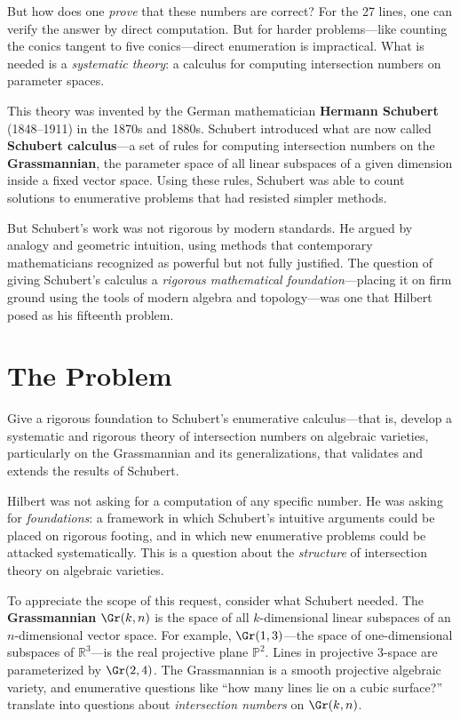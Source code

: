 But how does one \emph{prove} that these numbers are correct? For the 27 lines, one can verify the answer by direct computation. But for harder problems---like counting the conics tangent to five conics---direct enumeration is impractical. What is needed is a \emph{systematic theory}: a calculus for computing intersection numbers on parameter spaces.

This theory was invented by the German mathematician \textbf{Hermann Schubert} (1848--1911) in the 1870s and 1880s. Schubert introduced what are now called \textbf{Schubert calculus}---a set of rules for computing intersection numbers on the \textbf{Grassmannian}, the parameter space of all linear subspaces of a given dimension inside a fixed vector space. Using these rules, Schubert was able to count solutions to enumerative problems that had resisted simpler methods.

But Schubert's work was not rigorous by modern standards. He argued by analogy and geometric intuition, using methods that contemporary mathematicians recognized as powerful but not fully justified. The question of giving Schubert's calculus a \emph{rigorous mathematical foundation}---placing it on firm ground using the tools of modern algebra and topology---was one that Hilbert posed as his fifteenth problem.

\section{The Problem}

\begin{problem_statement}
Give a rigorous foundation to Schubert's enumerative calculus---that is, develop a systematic and rigorous theory of intersection numbers on algebraic varieties, particularly on the Grassmannian and its generalizations, that validates and extends the results of Schubert.
\end{problem_statement}

Hilbert was not asking for a computation of any specific number. He was asking for \emph{foundations}: a framework in which Schubert's intuitive arguments could be placed on rigorous footing, and in which new enumerative problems could be attacked systematically. This is a question about the \emph{structure} of intersection theory on algebraic varieties.

To appreciate the scope of this request, consider what Schubert needed. The \textbf{Grassmannian} $\Gr(k, n)$ is the space of all $k$-dimensional linear subspaces of an $n$-dimensional vector space. For example, $\Gr(1, 3)$---the space of one-dimensional subspaces of $\mathbb{R}^3$---is the real projective plane $\mathbb{P}^2$. Lines in projective $3$-space are parameterized by $\Gr(2,4)$. The Grassmannian is a smooth projective algebraic variety, and enumerative questions like ``how many lines lie on a cubic surface?'' translate into questions about \emph{intersection numbers} on $\Gr(k, n)$.

